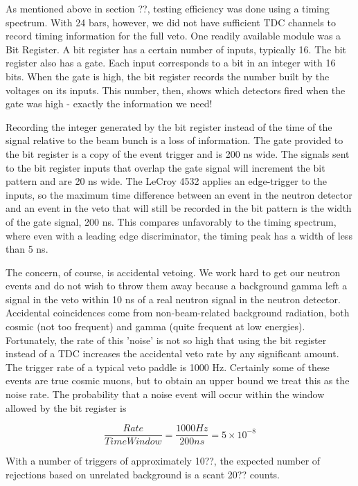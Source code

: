 As mentioned above in section ??, testing efficiency was done using a timing spectrum.  With 24 bars, however, we did not have sufficient TDC channels to record timing information for the full veto.  One readily available module was a Bit Register.  A bit register has a certain number of inputs, typically 16.  The bit register also has a gate.  Each input corresponds to a bit in an integer with 16 bits.  When the gate is high, the bit register records the number built by the voltages on its inputs.  This number, then, shows which detectors fired when the gate was high - exactly the information we need!

Recording the integer generated by the bit register instead of the time of the signal relative to the beam bunch is a loss of information.  The gate provided to the bit register is a copy of the event trigger and is 200 ns wide.  The signals sent to the bit register inputs that overlap the gate signal will increment the bit pattern and are 20 ns wide.  The LeCroy 4532 applies an edge-trigger to the inputs, so the maximum time difference between an event in the neutron detector and an event in the veto that will still be recorded in the bit pattern is the width of the gate signal, 200 ns.  This compares unfavorably to the timing spectrum, where even with a leading edge discriminator, the timing peak has a width of less than 5 ns.

The concern, of course, is accidental vetoing.  We work hard to get our neutron events and do not wish to throw them away because a background gamma left a signal in the veto within 10 ns of a real neutron signal in the neutron detector.  Accidental coincidences come from non-beam-related background radiation, both cosmic (not too frequent) and gamma (quite frequent at low energies).  Fortunately, the rate of this 'noise' is not so high that using the bit register instead of a TDC increases the accidental veto rate by any significant amount.  The trigger rate of a typical veto paddle is 1000 Hz.  Certainly some of these events are true cosmic muons, but to obtain an upper bound we treat this as the noise rate.  The probability that a noise event will occur within the window allowed by the bit register is 

\begin{equation}
\frac{Rate}{Time Window} = \frac{1000 Hz}{200 ns} = 5\times10^{-8}
\end{equation}

With a number of triggers of approximately 10??, the expected number of rejections based on unrelated background is a scant 20?? counts.


